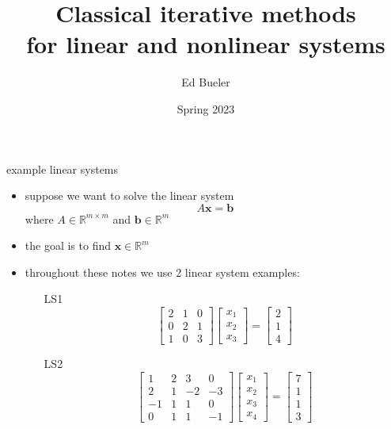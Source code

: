 \documentclass[10pt,hyperref]{beamer}
\title[Classical iterative methods]{Classical iterative methods \\ for linear and nonlinear systems}
\author{Ed Bueler}
\institute[MATH 615 NADE]{MATH 615 Numerical Analysis of Differential Equations}
\date{Spring 2023}
\newcommand{\bb}{\mathbf{b}}
\newcommand{\bx}{\mathbf{x}}
\newcommand{\RR}{\mathbb{R}}
\begin{document}
\begin{frame}
  \maketitle
\end{frame}


\begin{frame}{example linear systems}

\begin{itemize}
\item suppose we want to solve the linear system
\begin{equation}
A \bx = \bb \label{introsystem}
\end{equation}
where $A\in \RR^{m\times m}$ and $\bb\in \RR^m$
\item the goal is to find $\bx\in \RR^m$
\item  throughout these notes we use 2 linear system examples:
  \begin{itemize}
  \item[LS1] 
\begin{equation*}
\begin{bmatrix} 2 & 1 & 0 \\
                0 & 2 & 1 \\
                1 & 0 & 3 \end{bmatrix}
\begin{bmatrix} x_1 \\ x_2 \\ x_3 \end{bmatrix}
=
\begin{bmatrix} 2 \\ 1 \\ 4 \end{bmatrix}
\end{equation*}
  \item[LS2]
\begin{equation*}
\begin{bmatrix} 1 & 2 & 3 & 0 \\
                2 & 1 &-2 &-3 \\
               -1 & 1 & 1 & 0 \\
                0 & 1 & 1 &-1 \end{bmatrix}
\begin{bmatrix} x_1 \\ x_2 \\ x_3 \\ x_4 \end{bmatrix}
=
\begin{bmatrix} 7 \\ 1 \\ 1 \\ 3 \end{bmatrix}

\end{equation*}
\end{itemize}
\end{itemize}
\end{frame}
\end{document}
